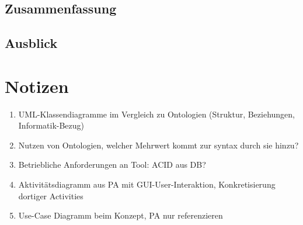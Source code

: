 \documentclass[12pt]{report}
\begin{document}
\section{Zusammenfassung}
\section{Ausblick}

\chapter{Notizen}
\begin{enumerate}
\item UML-Klassendiagramme im Vergleich zu Ontologien (Struktur, Beziehungen, Informatik-Bezug)
\item Nutzen von Ontologien, welcher Mehrwert kommt zur syntax durch sie hinzu?
\item Betriebliche Anforderungen an Tool: ACID aus DB? 
\item Aktivitätsdiagramm aus PA mit GUI-User-Interaktion, Konkretisierung dortiger Activities
\item Use-Case Diagramm beim Konzept, PA nur referenzieren
\end{enumerate}
\end{document}
